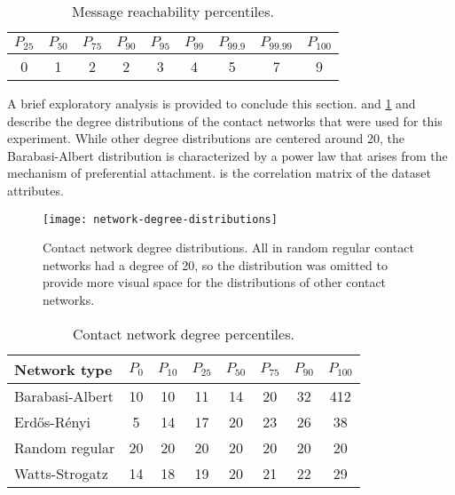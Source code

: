 \begin{table}[htbp]
\centering
\begin{tabular}{SSSSSSSSS}
  \toprule
  {$P_{25}$} & {$P_{50}$} & {$P_{75}$} & {$P_{90}$} & {$P_{95}$} & {$P_{99}$} & {$P_{99.9}$} & {$P_{99.99}$} & {$P_{100}$} \\
   & 1 & 2 & 2 & 3 & 4 & 5 & 7 & 9 \\
  \bottomrule
\end{tabular}
\caption[Message reachability percentiles]{Message reachability percentiles.}
\label{tab:message-reachability}
\end{table}

A brief exploratory analysis is provided to conclude this section.  and \cref{fig:network-degree-distributions} and  describe the degree distributions of the contact networks that were used for this experiment. While other degree distributions are centered around 20, the Barabasi-Albert distribution is characterized by a power law that arises from the mechanism of preferential attachment.  is the correlation matrix of the dataset attributes.

\begin{figure}[htbp]
  \centering
  \texttt{[image: network-degree-distributions]}
  \caption[Contact network degree distributions]{Contact network degree distributions. All \verticesName in random regular contact networks had a degree of 20, so the distribution was omitted to provide more visual space for the distributions of other contact networks.}
  \label{fig:network-degree-distributions}
\end{figure}

\begin{table}[htbp]
\centering
\begin{tabular}{lSSSSSSS}
  \toprule
  Network type & {$P_{0}$} & {$P_{10}$} & {$P_{25}$} & {$P_{50}$} & {$P_{75}$} & {$P_{90}$} & {$P_{100}$} \\
  \midrule
  Barabasi-Albert & 10 & 10 & 11 & 14 & 20 & 32 & 412 \\
  Erd\H{o}s-R\'{e}nyi & 5 & 14 & 17 & 20 & 23 & 26 & 38 \\
  Random regular & 20 & 20 & 20 & 20 & 20 & 20 & 20 \\
  Watts-Strogatz & 14 & 18 & 19 & 20 & 21 & 22 & 29 \\
  \bottomrule
\end{tabular}
\caption[Contact network degree percentiles]{Contact network degree percentiles.}
\label{tab:network-degree-percentiles}
\end{table}

